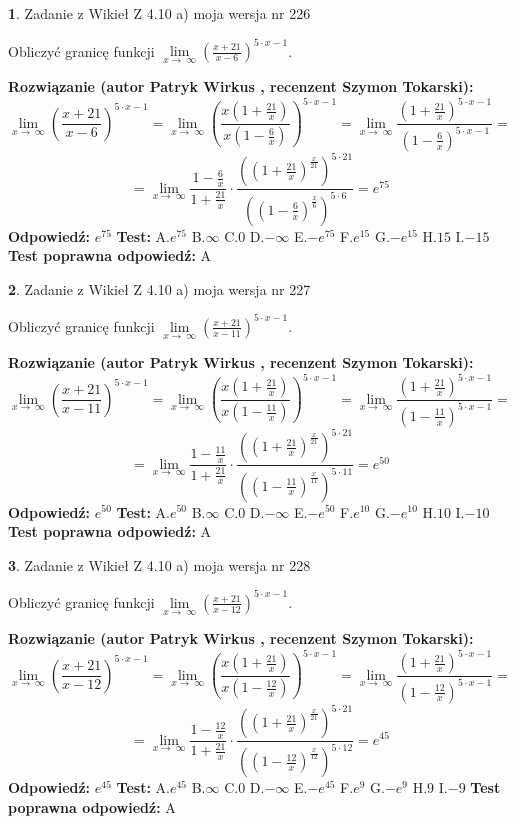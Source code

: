 \documentclass[12pt, a4paper]{article}
\theoremstyle{definition} %
\newtheorem{zad}{}
\newcommand{\zadStart}[1]{\begin{zad}#1\newline}
\newcommand{\zadStop}{\end{zad}}
\newcommand{\rozwStart}[2]{\noindent \textbf{Rozwiązanie (autor #1 , recenzent #2): }\newline}
\newcommand{\rozwStop}{\newline}
\newcommand{\odpStart}{\noindent \textbf{Odpowiedź:}\newline}
\newcommand{\odpStop}{\newline}
\newcommand{\testStart}{\noindent \textbf{Test:}\newline}
\newcommand{\testStop}{\newline}
\newcommand{\kluczStart}{\noindent \textbf{Test poprawna odpowiedź:}\newline}
\newcommand{\kluczStop}{\newline}
\begin{document}
\zadStart{Zadanie z Wikieł Z 4.10 a) moja wersja nr 226}

Obliczyć granicę funkcji  $\lim\limits_{x\to\ \infty}(\frac{x+21}{x-6})^{5\cdot x-1}$.
\zadStop
\rozwStart{Patryk Wirkus}{Szymon Tokarski}
$$\lim\limits_{x\to\ \infty}(\frac{x+21}{x-6})^{5\cdot x-1} = \lim\limits_{x\to\ \infty}(\frac{x(1+\frac{21}{x})}{x(1-\frac{6}{x})})^{5\cdot x-1}=\lim\limits_{x\to\ \infty}\frac{(1+\frac{21}{x})^{5\cdot x-1}}{(1-\frac{6}{x})^{5\cdot x-1}}=$$
$$=\lim\limits_{x\to\ \infty}\frac{1-\frac{6}{x}}{1+\frac{21}{x}}\cdot\frac{((1+\frac{21}{x})^{\frac{x}{21}})^{5\cdot21}}{((1-\frac{6}{x})^{\frac{x}{6}})^{5\cdot6}}=e^{75}$$
\rozwStop
\odpStart
$e^{75}$
\odpStop
\testStart
A.$e^{75}$ B.$\infty$ C.$0$ D.$-\infty$ E.$-e^{75}$
F.$e^{15}$ G.$-e^{15}$
H.$15$
I.$-15$
\testStop
\kluczStart
A
\kluczStop



\zadStart{Zadanie z Wikieł Z 4.10 a) moja wersja nr 227}

Obliczyć granicę funkcji  $\lim\limits_{x\to\ \infty}(\frac{x+21}{x-11})^{5\cdot x-1}$.
\zadStop
\rozwStart{Patryk Wirkus}{Szymon Tokarski}
$$\lim\limits_{x\to\ \infty}(\frac{x+21}{x-11})^{5\cdot x-1} = \lim\limits_{x\to\ \infty}(\frac{x(1+\frac{21}{x})}{x(1-\frac{11}{x})})^{5\cdot x-1}=\lim\limits_{x\to\ \infty}\frac{(1+\frac{21}{x})^{5\cdot x-1}}{(1-\frac{11}{x})^{5\cdot x-1}}=$$
$$=\lim\limits_{x\to\ \infty}\frac{1-\frac{11}{x}}{1+\frac{21}{x}}\cdot\frac{((1+\frac{21}{x})^{\frac{x}{21}})^{5\cdot21}}{((1-\frac{11}{x})^{\frac{x}{11}})^{5\cdot11}}=e^{50}$$
\rozwStop
\odpStart
$e^{50}$
\odpStop
\testStart
A.$e^{50}$ B.$\infty$ C.$0$ D.$-\infty$ E.$-e^{50}$
F.$e^{10}$ G.$-e^{10}$
H.$10$
I.$-10$
\testStop
\kluczStart
A
\kluczStop



\zadStart{Zadanie z Wikieł Z 4.10 a) moja wersja nr 228}

Obliczyć granicę funkcji  $\lim\limits_{x\to\ \infty}(\frac{x+21}{x-12})^{5\cdot x-1}$.
\zadStop
\rozwStart{Patryk Wirkus}{Szymon Tokarski}
$$\lim\limits_{x\to\ \infty}(\frac{x+21}{x-12})^{5\cdot x-1} = \lim\limits_{x\to\ \infty}(\frac{x(1+\frac{21}{x})}{x(1-\frac{12}{x})})^{5\cdot x-1}=\lim\limits_{x\to\ \infty}\frac{(1+\frac{21}{x})^{5\cdot x-1}}{(1-\frac{12}{x})^{5\cdot x-1}}=$$
$$=\lim\limits_{x\to\ \infty}\frac{1-\frac{12}{x}}{1+\frac{21}{x}}\cdot\frac{((1+\frac{21}{x})^{\frac{x}{21}})^{5\cdot21}}{((1-\frac{12}{x})^{\frac{x}{12}})^{5\cdot12}}=e^{45}$$
\rozwStop
\odpStart
$e^{45}$
\odpStop
\testStart
A.$e^{45}$ B.$\infty$ C.$0$ D.$-\infty$ E.$-e^{45}$
F.$e^{9}$ G.$-e^{9}$
H.$9$
I.$-9$
\testStop
\kluczStart
A
\kluczStop
\end{document}
